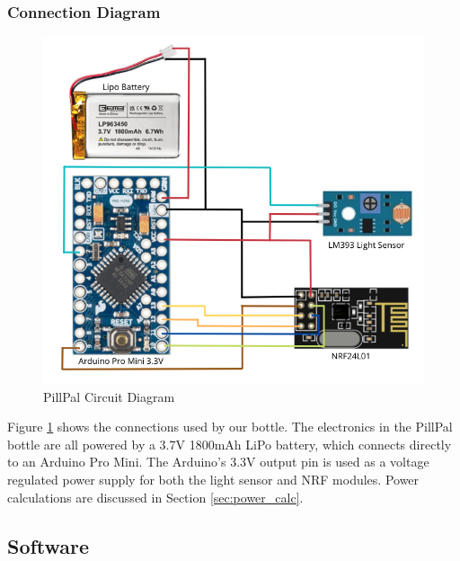 \documentclass[sigconf]{acmart}
\begin{document}
\subsubsection{Connection Diagram}
\begin{figure}[h]
  \centering
  \includegraphics[width=\linewidth]{images/circuit_diagram.png}
  \caption{PillPal Circuit Diagram}
  \label{fig:circuit}
\end{figure}

Figure \ref{fig:circuit} shows the connections used by our bottle. The electronics in the PillPal bottle are all powered by a 3.7V 1800mAh LiPo battery, which connects directly to an Arduino Pro Mini. The Arduino's 3.3V output pin is used as a voltage regulated power supply for both the light sensor and NRF modules. Power calculations are discussed in Section \ref{sec:power_calc}.

\subsection{Software}
\end{document}
